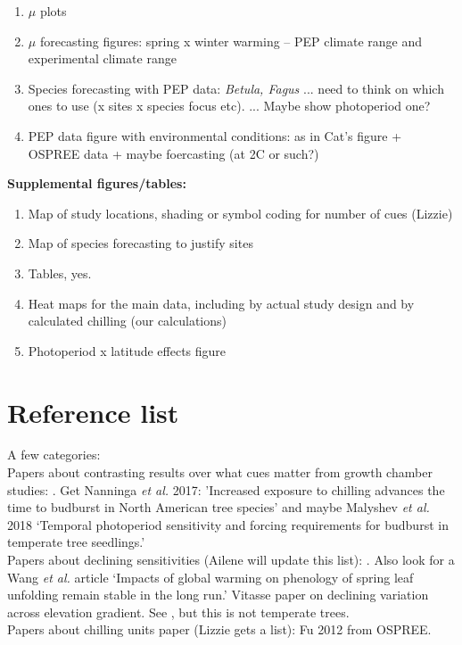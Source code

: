 \documentclass[11pt,letter]{article}
\begin{document}
\begin{enumerate}
\item $\mu$ plots
\item  $\mu$ forecasting figures: spring x winter warming -- PEP climate range and experimental climate range
\item Species forecasting with PEP data: \emph{Betula, Fagus} ... need to think on which ones to use (x sites x species focus etc). ... Maybe show photoperiod one?
\item PEP data figure with environmental conditions: as in Cat's figure + OSPREE data + maybe foercasting (at 2C or such?)
\end{enumerate}


{\bf Supplemental figures/tables:}
\begin{enumerate}
\item Map of study locations, shading or symbol coding for number of cues (Lizzie)
\item Map of species forecasting to justify sites
\item Tables, yes.
\item Heat maps for the main data, including by actual study design and by calculated chilling (our calculations)
\item Photoperiod x latitude effects figure
\end{enumerate}

\section{Reference list}

A few categories:\\

Papers about contrasting results over what cues matter from growth chamber studies: \cite{Basler:2012,Basler:2014aa,Caffarra:2011qf,Caffarra:2011a,Caffarra:2011b,Heide:2005aa,koerner2010b,Laube:2014a,vitasse2013,zohner2016}. Get Nanninga \emph{et al.} 2017: 'Increased exposure to chilling advances the time to budburst in North American tree species' and maybe Malyshev \emph{et al.} 2018 `Temporal photoperiod sensitivity and forcing requirements for budburst in temperate tree seedlings.'\\

Papers about declining sensitivities (Ailene will update this list): \cite{Rutishauser:2008fu,fu2015}. Also look for a Wang \emph{et al.} article `Impacts of global warming on phenology of spring leaf unfolding remain stable in the long run.' Vitasse paper on declining variation across elevation gradient. See \cite{yu2010}, but this is not temperate trees. \\

Papers about chilling units paper (Lizzie gets a list): Fu 2012 from OSPREE. \cite{harrington2015}\cite{lued2011,Luedeling:2011qe,Luedeling2013AgFM}\\


\end{document}
